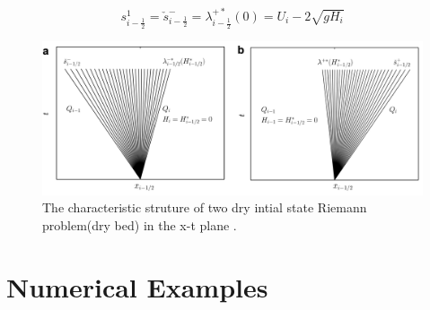 \documentclass[12pt,a4paper]{article}
\begin{document}
	\begin{equation}
		s_{i-\frac{1}{2}}^{1} = \check{s}_{i-\frac{1}{2}}^{-} = \lambda_{i-\frac{1}{2}}^{+*}(0)= U_{i} - 2\sqrt{gH_{i}}
		\label{wd1}
	\end{equation}
	
	\begin{figure}[H]
		\centering
		\includegraphics[width=.95\linewidth]{images/wet-dry}
		\caption{ The characteristic struture of  two dry intial state Riemann problem(dry bed) in the x-t plane \cite{ge:2008}.}
		\label{fig:wet-dry}
	\end{figure}
	
	
	
	
	\section{Numerical Examples}



	
	
	
\end{document}
